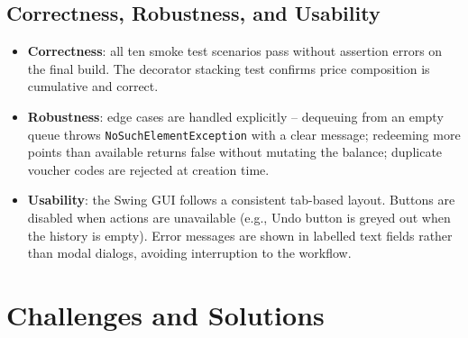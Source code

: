 \documentclass[11pt,a4paper]{article}
\begin{document}
\subsection{Correctness, Robustness, and Usability}
\begin{itemize}[leftmargin=*]
    \item \textbf{Correctness}: all ten smoke test scenarios pass without assertion errors on the final build. The decorator stacking test confirms price composition is cumulative and correct.
    \item \textbf{Robustness}: edge cases are handled explicitly -- dequeuing from an empty queue throws \texttt{NoSuchElementException} with a clear message; redeeming more points than available returns false without mutating the balance; duplicate voucher codes are rejected at creation time.
    \item \textbf{Usability}: the Swing GUI follows a consistent tab-based layout. Buttons are disabled when actions are unavailable (e.g., Undo button is greyed out when the history is empty). Error messages are shown in labelled text fields rather than modal dialogs, avoiding interruption to the workflow.
\end{itemize}

\newpage

\section{Challenges and Solutions}
\end{document}
